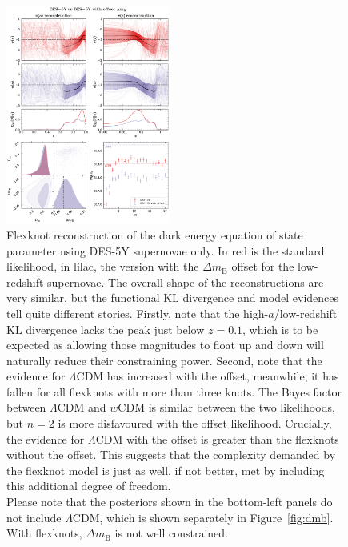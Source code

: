 \documentclass[fleqn,usenatbib]{mnras}
\newcommand{\lcdm}{$\Lambda$CDM}
\newcommand{\dmb}{\ensuremath{\Delta m_\mathrm B}}
\begin{document}
    \begin{figure}
        \begin{center}
            \includegraphics[width=0.48\textwidth]{plots/des5yoffset_20_wa.pdf}
        \end{center}
        \caption{
            Flexknot reconstruction of the dark energy equation of state parameter using DES-5Y supernovae only.
            In red is the standard likelihood, in lilac, the version with the \dmb{} offset for the low-redshift supernovae.
            The overall shape of the reconstructions are very similar, but the functional KL divergence and model evidences tell quite different stories.
            Firstly, note that the high-$a$/low-redshift KL divergence lacks the peak just below $z=0.1$, which is to be expected as allowing those magnitudes to float up and down will naturally reduce their constraining power.
            Second, note that the evidence for \lcdm{} has increased with the offset, meanwhile, it has fallen for all flexknots with more than three knots.
            The Bayes factor between \lcdm{} and $w$CDM is similar between the two likelihoods, but $n=2$ is more disfavoured with the offset likelihood.
            Crucially, the evidence for \lcdm{} with the offset is greater than the flexknots without the offset.
            This suggests that the complexity demanded by the flexknot model is just as well, if not better, met by including this additional degree of freedom.\\
            Please note that the posteriors shown in the bottom-left panels do not include \lcdm{}, which is shown separately in Figure~\ref{fig:dmb}.
            With flexknots, \dmb{} is not well constrained.
        }\label{fig:des5y}
    \end{figure}
    
\end{document}
